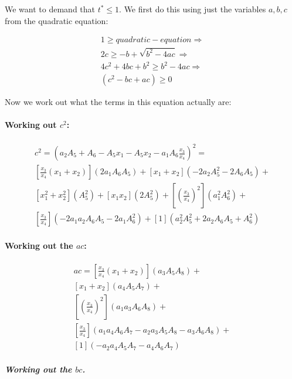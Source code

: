 \documentclass[UKenglish]{lipics-v2019}
\begin{document}
We want to demand that $t^* \le 1$. We first do this using just the variables $a,b,c$ from the quadratic equation:

\begin{align*}
     1 \ge quadratic-equation \Rightarrow \\
    2c \ge -b + \sqrt{b^2 - 4 ac} \Rightarrow \\
    4c^2 + 4bc + b^2 \ge b^2 - 4 ac \Rightarrow \\
    (c^2 - bc + ac) \ge 0 
\end{align*}


Now we work out what the terms in this equation actually are: 

\paragraph*{Working out $c^2$:}

\begin{align*}
    c^2 = \left(a_2 A_5 + A_6- A_5x_1  - A_5x_2  - a_1A_6 \frac{x_3}{x_4} \right)^2 = \\
    \left[\frac{x_3}{x_4}(x_1 + x_2)\right]( 2 a_1 A_6 A_5) + 
    [x_1 + x_2](- 2 a_2 A_5^2 - 2 A_6 A_5) +\\
    [x_1^2 + x_2^2](A_5^2) +
    [x_1x_2](2A_5^2) +
   \left [\left( \frac{x_3}{x_4} \right)^2 \right](a_1^2 A_6^2) + \\
    \left[\frac{x_3}{x_4}\right]( - 2 a_1 a_2 A_6 A_5  - 2 a_1 A_6^2) +
    [1](a_2^2 A_5^2+ 2 a_2 A_6 A_5+ A_6^2)
\end{align*}


\paragraph*{Working out the $ac$:}

\begin{align*}
    ac = 
     \left[\frac{x_3}{x_4}(x_1 + x_2)\right](a_3 A_5 A_8) + \\
     [x_1 + x_2](a_4 A_5 A_7) +\\
    \left [\left( \frac{x_3}{x_4} \right)^2 \right](a_1 a_3 A_6 A_8) +\\
      \left[\frac{x_3}{x_4}\right](a_1 a_4 A_6 A_7- a_2 a_3 A_5 A_8- a_3 A_6 A_8) +\\
     [1](- a_2 a_4 A_5 A_7 - a_4 A_6 A_7)
\end{align*}

\subparagraph{Working out the $bc$.}
\end{document}

